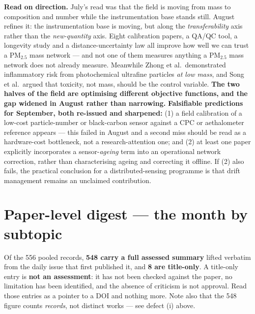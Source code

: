 \documentclass[10pt]{article}
\begin{document}
\footnotesize
\textbf{Read on direction.} July's read was that the field is moving from mass to
composition and number while the instrumentation base stands still. August refines it:
the instrumentation base is moving, but along the \emph{transferability} axis rather than
the \emph{new-quantity} axis. Eight calibration papers, a QA/QC tool, a longevity study
and a distance-uncertainty law all improve how well we can trust a PM$_{2.5}$ mass
network --- and not one of them measures anything a PM$_{2.5}$ mass network does not
already measure. Meanwhile Zhong et al.\ demonstrated inflammatory risk from
photochemical ultrafine particles \emph{at low mass}, and Song et al.\ argued that
toxicity, not mass, should be the control variable. \textbf{The two halves of the field
are optimising different objective functions, and the gap widened in August rather than
narrowing.}
\textbf{Falsifiable predictions for September, both re-issued and sharpened:}
(1) a field calibration of a low-cost particle-number or black-carbon sensor against a
CPC or aethalometer reference appears --- this failed in August and a second miss should
be read as a hardware-cost bottleneck, not a research-attention one; and
(2) at least one paper explicitly incorporates a sensor-\emph{ageing} term into an
operational network correction, rather than characterising ageing and correcting it
offline. If (2) also fails, the practical conclusion for a distributed-sensing
programme is that drift management remains an unclaimed contribution.

\clearpage

\section*{\sffamily\bfseries\color{Deep}Paper-level digest --- the month by subtopic}
\vspace{-1.5mm}{\color{Coral}\rule{\linewidth}{1.1pt}}\vspace{2mm}

\footnotesize
Of the 556 pooled records, \textbf{548 carry a full assessed summary} lifted verbatim
from the daily issue that first published it, and \textbf{8 are title-only}. A title-only
entry is \textbf{not an assessment}: it has not been checked against the paper, no
limitation has been identified, and the absence of criticism is not approval. Read
those entries as a pointer to a DOI and nothing more. Note also that the 548 figure
counts \emph{records}, not distinct works --- see defect (i) above.
\end{document}
